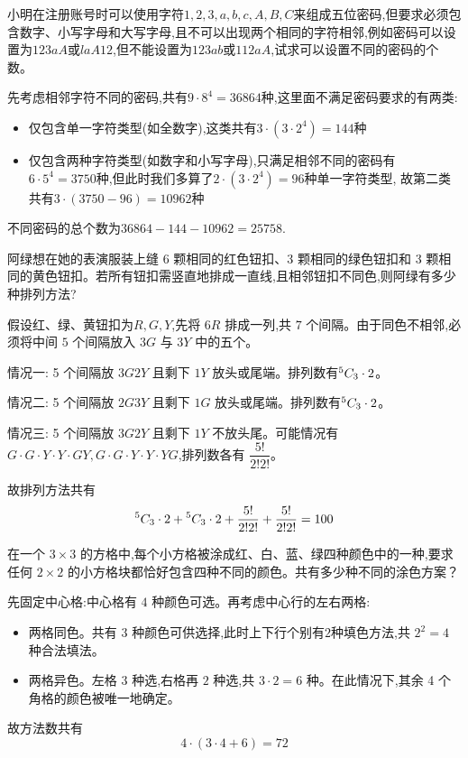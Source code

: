 \begin{questions}
    \question 小明在注册账号时可以使用字符$1,2,3,a,b,c,A,B,C$来组成五位密码,但要求必须包含数字、小写字母和大写字母,且不可以出现两个相同的字符相邻,例如密码可以设置为$123aA$或$laA12$,但不能设置为$123ab$或$112aA$,试求可以设置不同的密码的个数。
    \begin{solution}
        先考虑相邻字符不同的密码,共有$9 \cdot 8^4 = 36864$种,这里面不满足密码要求的有两类:
        \begin{itemize}
            \item 仅包含单一字符类型(如全数字),这类共有$3 \cdot (3 \cdot 2^4) = 144$种
            \item 仅包含两种字符类型(如数字和小写字母),只满足相邻不同的密码有$6 \cdot 5^4 = 3750$种,但此时我们多算了$2 \cdot (3 \cdot 2^4) = 96$种单一字符类型, 故第二类共有$3 \cdot (3750 - 96) = 10962$种
        \end{itemize}
        不同密码的总个数为$36864 - 144 - 10962 = 25758$.
    \end{solution}

    \question 阿绿想在她的表演服装上缝 6 颗相同的红色钮扣、3 颗相同的绿色钮扣和 3 颗相同的黄色钮扣。若所有钮扣需竖直地排成一直线,且相邻钮扣不同色,则阿绿有多少种排列方法?
    \begin{solution}
        假设红、绿、黄钮扣为$R,G,Y$,先将 $6R$ 排成一列,共 $7$ 个间隔。由于同色不相邻,必须将中间 $5$ 个间隔放入 $3G$ 与 $3Y$ 中的五个。

        情况一: 5 个间隔放 $3G2Y$ 且剩下 $1Y$ 放头或尾端。排列数有${}^{5}C_{3}\cdot 2$。

        情况二: 5 个间隔放 $2G3Y$ 且剩下 $1G$ 放头或尾端。排列数有${}^{5}C_{3}\cdot 2$。

        情况三: 5 个间隔放 $3G2Y$ 且剩下 $1Y$ 不放头尾。可能情况有$G\cdot G\cdot Y\cdot Y\cdot \boxed{GY},G\cdot G\cdot Y\cdot Y\cdot \boxed{YG}$,排列数各有 $\dfrac{5!}{2!2!}$。

        故排列方法共有
        \[
        {}^{5}C_{3}\cdot 2+{}^{5}C_{3}\cdot 2+\frac{5!}{2!2!}+\frac{5!}{2!2!}=100
        \]
    \end{solution}

    
    \question 在一个 $3\times3$ 的方格中,每个小方格被涂成红、白、蓝、绿四种颜色中的一种,要求任何 $2\times2$ 的小方格块都恰好包含四种不同的颜色。共有多少种不同的涂色方案？
    \begin{solution}
        先固定中心格:中心格有 $4$ 种颜色可选。再考虑中心行的左右两格:
        \begin{itemize}
        \item 两格同色。共有 $3$ 种颜色可供选择,此时上下行个别有$2$种填色方法,共 $2^2=4$ 种合法填法。  
        \item 两格异色。左格 $3$ 种选,右格再 $2$ 种选,共 $3\cdot2=6$ 种。在此情况下,其余 4 个角格的颜色被唯一地确定。
        \end{itemize}
        故方法数共有 
        \[
        4 \cdot (3 \cdot 4 + 6) =72
        \]
    \end{solution}


\end{questions}

